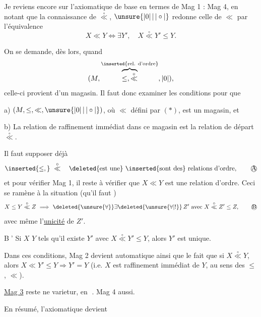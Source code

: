 Je reviens encore sur l'axiomatique de base en termes de Mag 1 : Mag 4, en notant que la connaissance de $\overset{\circ}{\ll}$, $\unsure{|0|\,|\,|\circ|}$ redonne celle de $\ll$ par l'équivalence
\[
X\ll Y\Longleftrightarrow\exists Y',\quad X\overset{\circ}{\ll}Y'\leq Y.\tag*{($\ast$)}
\]

On se demande, dès lors, quand    
\[
(M,\overbrace{\leq,\overset{\circ}{\ll}}^{\inserted{\text{rel. d'ordre}}},|0|),
\]
 celle-ci provient d'un magasin. Il faut donc examiner les conditions pour que


 a) $(M,\leq,\ll,\unsure{|0|\,|\,|\circ|})$, où $\ll$ défini par $(\ast)$, est un magasin, et

 b) La relation de raffinement immédiat dans ce magasin est la relation de départ $\overset{\circ}{\ll}$.

Il faut supposer déjà
\[
\inserted{\leq,}\ \overset{\circ}{\ll}\quad\deleted{\text{est une}}\ \inserted{\text{sont des}}\ \text{relations d'ordre},\tag*{\textcircled{A}}
\]
et pour vérifier Mag 1, il reste à vérifier que $X\ll Y$ est une relation d'ordre. Ceci se ramène à la situation (qu'il faut )
\[
X\leq Y\overset{\circ}{\ll}Z\ \Longrightarrow\ \deleted{\unsure{\forall}}\exists\deleted{\unsure{\forall|!}}\,Z'\text{ avec }X\overset{\circ}{\ll}Z'\leq Z,\tag*{\textcircled{B}}
\]
avec même l'\uline{unicité} de $Z'$.  

\textcircled{B'} Si $X$  $Y$ tels qu'il existe $Y'$ avec $X\overset{\circ}{\ll}Y'\leq Y$, alors $Y'$ est unique.

Dans ces conditions, Mag 2 devient automatique ainsi que le fait que si $X\overset{\circ}{\ll}Y$, alors   $X\ll Y'\leq Y\Longrightarrow Y'=Y$ (i.e. $X$ est raffinement immédiat de $Y$, au sens des  $\leq$, $\ll$).

\uline{Mag 3} reste ne varietur, en \textcircled{}. Mag 4 aussi.

En résumé, l'axiomatique devient

